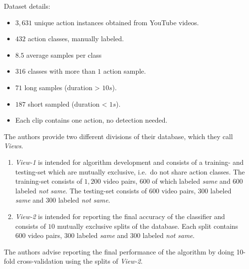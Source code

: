 Dataset details: \cite{kliper-gross_action_2012}
\begin{itemize}
    \item $3,631$ unique action instances obtained from YouTube videos.
    \item $432$ action classes, manually labeled.
    \item $8.5$ average samples per class
    \item $316$ classes with more than $1$ action sample.
    \item $71$ long samples (duration > $10s$).
    \item $187$ short sampled (duration < $1s$).
    \item Each clip contains one action, no detection needed.
\end{itemize}

The authors provide two different divisions of their database, which they call \textit{Views}.

\begin{enumerate}
    \item \textit{View-1} is intended for algorithm development and consists of a training- and testing-set which are mutually exclusive, i.e.\ do not share action classes.
        The training-set consists of $1,200$ video pairs, $600$ of which labeled \textit{same} and $600$ labeled \textit{not same}.
        The testing-set consists of $600$ video pairs, $300$ labeled \textit{same} and $300$ labeled \textit{not same}.
    \item \textit{View-2} is intended for reporting the final accuracy of the classifier and consists of $10$ mutually exclusive splits of the database.
        Each split contains 600 video pairs, $300$ labeled \textit{same} and $300$ labeled \textit{not same}.
\end{enumerate}
The authors advise reporting the final performance of the algorithm by doing 10-fold cross-validation using the splits of \textit{View-2}.


